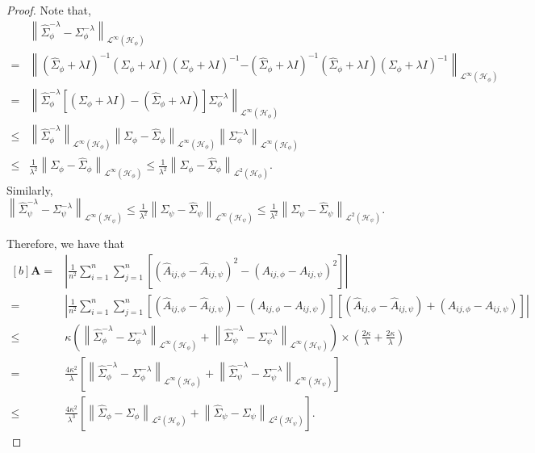 \documentclass[11pt]{article}
\newcommand{\HS}{\mathcal{L}^{2}}
\newcommand{\Op}{\mathcal{L}^{\infty}}
\newcommand{\repone}{\phi}
\newcommand{\reptwo}{\psi}
\newcommand{\Hone}{\mathcal{H}_{\phi}}
\newcommand{\Htwo}{\mathcal{H}_{\psi}}
\newcommand{\norm}[1]{\left\|#1\right\|}
\theoremstyle{plain}
\begin{document}
\begin{proof}
Note that,
\[
\begin{aligned}
    &\norm{\hat{\Sigma}_{\repone}^{-\lambda}-\Sigma_{\repone}^{-\lambda}}_{\Op(\Hone)}\\
    =&\left\|\left(\hat{\Sigma}_{\repone}+\lambda I\right)^{-1}\left(\Sigma_{\repone}+\lambda I\right)\left(\Sigma_{\repone}+\lambda I\right)^{-1} \right.\left.- \left(\hat{\Sigma}_{\repone}+\lambda I\right)^{-1}\left(\hat{\Sigma}_{\repone}+\lambda I\right)\left(\Sigma_{\repone}+\lambda I\right)^{-1}\right\|_{\Op(\Hone)}\\
    =&\norm{\hat{\Sigma}_{\repone}^{-\lambda}\left[\left(\Sigma_{\repone}+\lambda I\right)-\left(\hat{\Sigma}_{\repone}+\lambda I\right)\right]\Sigma_{\repone}^{-\lambda}}_{\Op(\Hone)}\\
    \leq& \norm{\hat{\Sigma}_{\repone}^{-\lambda}}_{\Op(\Hone)} \norm{\Sigma_{\repone} - \hat{\Sigma}_{\repone}}_{\Op(\Hone)} \norm{\Sigma_{\repone}^{-\lambda}}_{\Op(\Hone)}\\
    \leq& \frac{1}{\lambda^{2}}\norm{\Sigma_{\repone} - \hat{\Sigma}_{\repone}}_{\Op(\Hone)}
    \leq \frac{1}{\lambda^{2}}\norm{\Sigma_{\repone} - \hat{\Sigma}_{\repone}}_{\HS(\Hone)}.
\end{aligned}
\]
Similarly, $\norm{\hat{\Sigma}_{\reptwo}^{-\lambda}-\Sigma_{\reptwo}^{-\lambda}}_{\Op(\Htwo)}\leq \frac{1}{\lambda^{2}}\norm{\Sigma_{\reptwo} - \hat{\Sigma}_{\reptwo}}_{\Op(\Htwo)}\leq \frac{1}{\lambda^{2}}\norm{\Sigma_{\reptwo} - \hat{\Sigma}_{\reptwo}}_{\HS(\Htwo)}$.

Therefore, we have that 
\begin{equation}\label{Bound on A}
\begin{aligned}[b]
    \mathbf{A}
    =&\left|\frac{1}{n^{2}}\sum_{i=1}^{n}\sum_{j=1}^{n}\left[\left(\hat{A}_{ij,\repone}-\hat{A}_{ij,\reptwo}\right)^{2} - \left(A_{ij,\repone}-A_{ij,\reptwo}\right)^{2}\right]\right|\\
    =& \left|\frac{1}{n^{2}}\sum_{i=1}^{n}\sum_{j=1}^{n}\left[\left(\hat{A}_{ij,\repone}-\hat{A}_{ij,\reptwo}\right) - \left(A_{ij,\repone}-A_{ij,\reptwo}\right)\right]\right.\left.\left[\left(\hat{A}_{ij,\repone}-\hat{A}_{ij,\reptwo}\right) + \left(A_{ij,\repone}-A_{ij,\reptwo}\right)\right]\right|\\
    \leq& \kappa \left(\norm{\hat{\Sigma}_{\repone}^{-\lambda}-\Sigma_{\repone}^{-\lambda}}_{\Op(\Hone)} + \norm{\hat{\Sigma}_{\reptwo}^{-\lambda}-\Sigma_{\reptwo}^{-\lambda}}_{\Op(\Htwo)}\right)\times \left(\frac{2\kappa}{\lambda}+\frac{2\kappa}{\lambda}\right)\\
    =&\frac{4\kappa^{2}}{\lambda}\left[\norm{\hat{\Sigma}_{\repone}^{-\lambda}-\Sigma_{\repone}^{-\lambda}}_{\Op(\Hone)} + \norm{\hat{\Sigma}_{\reptwo}^{-\lambda}-\Sigma_{\reptwo}^{-\lambda}}_{\Op(\Htwo)}\right]\\
    \leq&\frac{4\kappa^{2}}{\lambda^{3}}\left[\norm{\hat{\Sigma}_{\repone}-\Sigma_{\repone}}_{\HS(\Hone)} + \norm{\hat{\Sigma}_{\reptwo}-\Sigma_{\reptwo}}_{\HS(\Htwo)}\right].
\end{aligned}
\end{equation}


\end{proof}
\end{document}
